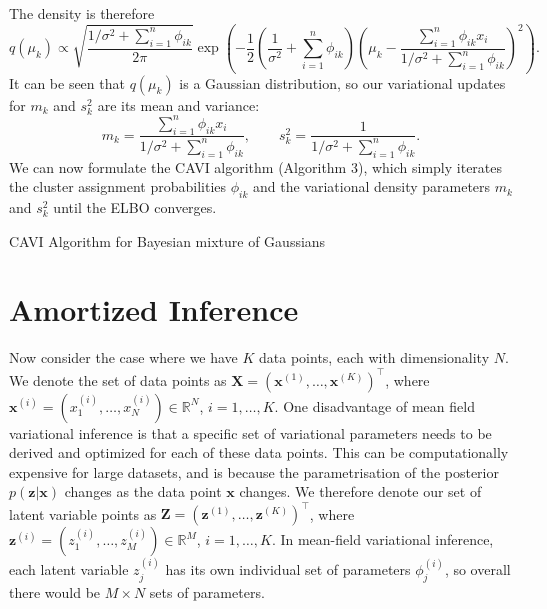 \documentclass[honours,12pt]{unswthesis}
\newcommand{\R}{\mathbb{R}}
\numberwithin{equation}{section}
\theoremstyle{definition}
\begin{document}
The density is therefore
\[q(\mu_k)\propto \sqrt{\frac{1/\sigma^2+\sum^n_{i=1}\phi_{ik}}{2\pi}}\exp\left(-\frac{1}{2}\left(\frac{1}{\sigma^2}+\sum^n_{i=1}\phi_{ik}\right) \left(\mu_k-\frac{\sum^n_{i=1}\phi_{ik}x_i}{1/\sigma^2+\sum^n_{i=1}\phi_{ik}}\right)^2\right).\]
It can be seen that $q(\mu_k)$ is a Gaussian distribution, so our variational updates for $m_k$ and $s^2_k$ are its mean and variance:
\[m_k=\frac{\sum^n_{i=1}\phi_{ik}x_i}{1/\sigma^2+\sum^n_{i=1}\phi_{ik}}, \qquad s^2_k=\frac{1}{1/\sigma^2+\sum^n_{i=1}\phi_{ik}}.\]
We can now formulate the CAVI algorithm (Algorithm 3), which simply iterates the cluster assignment probabilities $\phi_{ik}$ and the variational density parameters $m_k$ and $s^2_k$ until the ELBO converges.
\begin{algorithm}
\caption{CAVI Algorithm for Bayesian mixture of Gaussians}
\BlankLine
{}
\end{algorithm}
\newpage
\section{Amortized Inference}
Now consider the case where we have $K$ data points, each with dimensionality $N$. We denote the set of data points as $\bm{X}=(\bm{x}^{(1)},\dots,\bm{x}^{(K)})^\top$, where $\bm{x}^{(i)}=(x^{(i)}_1,\dots,x^{(i)}_N)\in \R^N$, $i=1,\dots,K$. One disadvantage of mean field variational inference is that a specific set of variational parameters needs to be derived and optimized for each of these data points. This can be computationally expensive for large datasets, and is because the parametrisation of the posterior $p(\bm{z}|\bm{x})$ changes as the data point $\bm{x}$ changes. We therefore denote our set of latent variable points as $\bm{Z}=(\bm{z}^{(1)},\dots,\bm{z}^{(K)})^\top$, where $\bm{z}^{(i)}=(z^{(i)}_1,\dots,z^{(i)}_M)\in \R^M$, $i=1,\dots,K$. In mean-field variational inference, each latent variable $z_j^{(i)}$ has its own individual set of parameters $\phi_j^{(i)}$, so overall there would be $M\times N$ sets of parameters.
\end{document}
